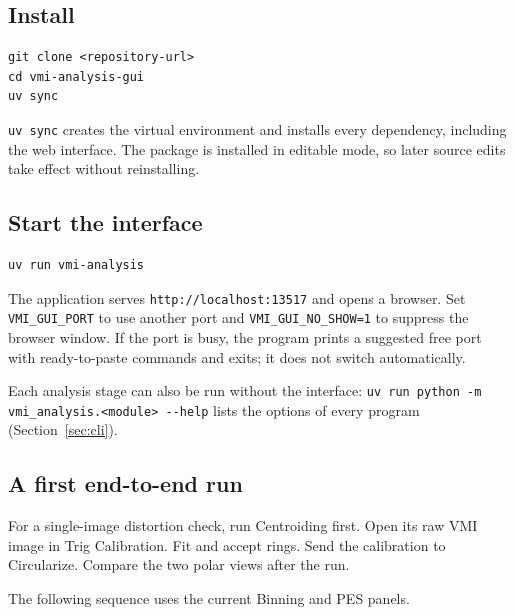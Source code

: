 \documentclass[11pt,a4paper]{article}
\newcommand{\code}[1]{\texttt{#1}}
\begin{document}
\subsection{Install}

\begin{verbatim}
git clone <repository-url>
cd vmi-analysis-gui
uv sync
\end{verbatim}

\code{uv sync} creates the virtual environment and installs every
dependency, including the web interface. The package is installed in
editable mode, so later source edits take effect without reinstalling.

\subsection{Start the interface}

\begin{verbatim}
uv run vmi-analysis
\end{verbatim}

The application serves \code{http:/\allowbreak{}/\allowbreak{}localhost:13517} and opens a browser.
Set \code{VMI\_\allowbreak{}GUI\_\allowbreak{}PORT} to use another port and
\code{VMI\_\allowbreak{}GUI\_\allowbreak{}NO\_\allowbreak{}SHOW=1} to suppress the browser window. If the port is
busy, the program prints a suggested free port with ready-to-paste commands
and exits; it does not switch automatically.

Each analysis stage can also be run without the interface:
\code{uv run python -\allowbreak{}m vmi\_\allowbreak{}analysis.<module> -\allowbreak{}-\allowbreak{}help} lists the options of
every program (Section~\ref{sec:cli}).

\subsection{A first end-to-end run}

For a single-image distortion check, run Centroiding first.
Open its raw VMI image in Trig Calibration. Fit and accept rings.
Send the calibration to Circularize. Compare the two polar views after the run.

The following sequence uses the current Binning and PES panels.
\end{document}
